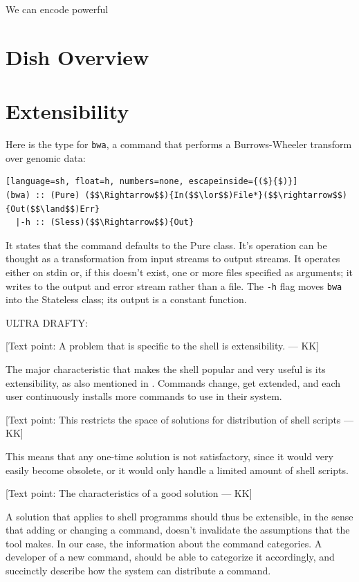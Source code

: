 \documentclass[sigplan,10pt,review,anonymous]{acmart}
\newcommand{\ttt}[1]{\texttt{\small #1}}
\newcommand{\kk}[1]{[{\color{magenta}#1 --- KK}]}
\begin{document}
We can encode powerful

\section{Dish Overview}


\section{Extensibility}

Here is the type for \ttt{bwa}, a command that performs a Burrows-Wheeler transform over genomic data:
\begin{lstlisting}[language=sh, float=h, numbers=none, escapeinside={($}{$)}]
(bwa) :: (Pure) ($$\Rightarrow$$){In($$\lor$$)File*}($$\rightarrow$$){Out($$\land$$)Err}
  |-h :: (Sless)($$\Rightarrow$$){Out}                              
\end{lstlisting}

It states that the command defaults to the Pure class.
It's operation can be thought as a transformation from input streams to output streams.
It operates either on stdin or, if this doesn't exist, one or more files specified as arguments;
  it writes to the output and error stream rather than a file.
The \ttt{-h} flag moves \ttt{bwa} into the Stateless class;
  its output is a constant function.


ULTRA DRAFTY:

\kk{Text point: A problem that is specific to the shell is
  extensibility.}

The major characteristic that makes the shell popular and very useful
is its extensibility, as also mentioned in . Commands change,
get extended, and each user continuously installs more commands to use
in their system.

\kk{Text point: This restricts the space of solutions for distribution
  of shell scripts}

This means that any one-time solution is not satisfactory, since it
would very easily become obsolete, or it would only handle a limited
amount of shell scripts.

\kk{Text point: The characteristics of a good solution}

A solution that applies to shell programms should thus be extensible,
in the sense that adding or changing a command, doesn't invalidate the
assumptions that the tool makes. In our case, the information about
the command categories. A developer of a new command, should be able
to categorize it accordingly, and succinctly describe how the system
can distribute a command.
\end{document}
